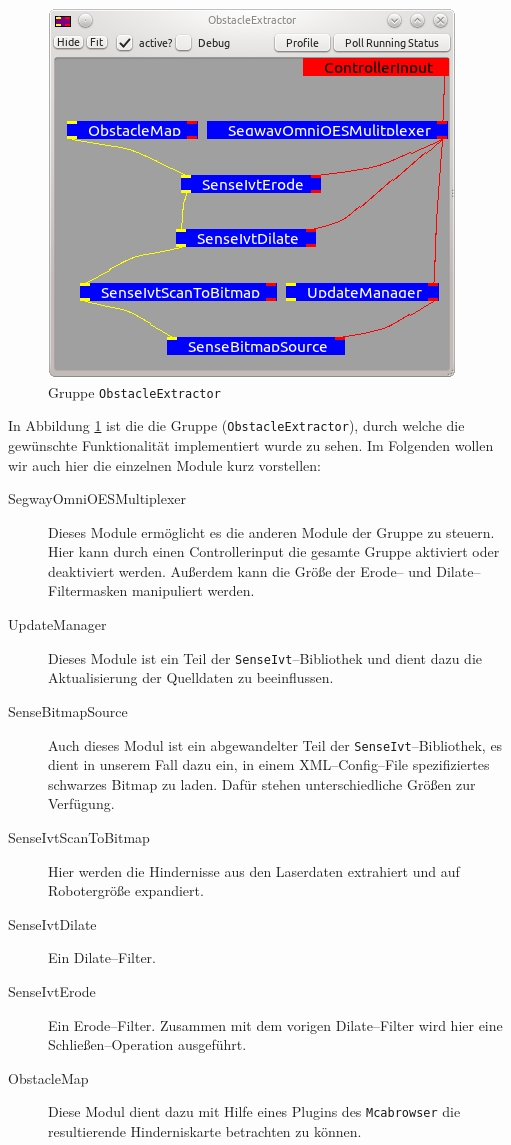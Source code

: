 \begin{figure}[h]
\center
\includegraphics[scale=0.8]{graphics/ObstacleExtractor.jpg}
\caption{\label{fig:obstacleExtractor} Gruppe \lstinline{ObstacleExtractor}}
\end{figure}
 In Abbildung \ref{fig:obstacleExtractor} ist die die Gruppe
 (\lstinline{ObstacleExtractor}), durch welche die gewünschte Funktionalität implementiert wurde zu sehen.
 Im Folgenden wollen wir auch hier die einzelnen Module kurz vorstellen:

\begin{description}
\item[SegwayOmniOESMultiplexer] Dieses Module ermöglicht es die anderen Module der Gruppe zu steuern.
 Hier kann durch einen Controllerinput die gesamte Gruppe aktiviert oder deaktiviert werden.
 Außerdem kann die Größe der Erode-- und Dilate--Filtermasken manipuliert werden.
\item[UpdateManager] Dieses Module ist ein Teil der
\lstinline{SenseIvt}--Bibliothek und dient dazu die Aktualisierung der Quelldaten
zu beeinflussen.
\item[SenseBitmapSource] Auch dieses Modul ist ein abgewandelter Teil der
\lstinline{SenseIvt}--Bibliothek, es dient in unserem Fall dazu ein, in einem
 XML--Config--File spezifiziertes schwarzes Bitmap zu laden.
 Dafür stehen unterschiedliche Größen zur Verfügung.
\item[SenseIvtScanToBitmap] Hier werden die Hindernisse aus den Laserdaten extrahiert und auf Robotergröße expandiert.
\item[SenseIvtDilate] Ein Dilate--Filter.
\item[SenseIvtErode] Ein Erode--Filter. Zusammen mit dem vorigen Dilate--Filter
wird hier eine Schlie\-ßen--Operation ausgeführt.
\item[ObstacleMap] Diese Modul dient dazu mit Hilfe eines Plugins des
\lstinline{Mcabrowser} die resultierende Hinderniskarte betrachten zu können.
\end{description}

